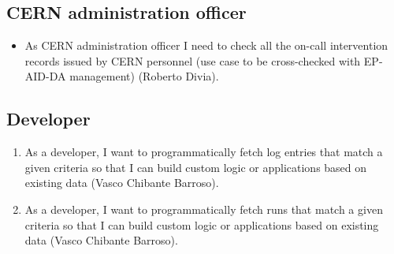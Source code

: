 \subsection{CERN administration officer}
\begin{itemize}
  \item As CERN administration officer I need to check all the on-call intervention records issued by CERN personnel (use case to be cross-checked with EP-AID-DA management) (Roberto Divia).
\end{itemize}

\subsection{Developer}
\begin{enumerate}
  \item As a developer, I want to programmatically fetch log entries that match a given criteria so that I can build custom logic or applications based on existing data (Vasco Chibante Barroso). 
  \item As a developer, I want to programmatically fetch runs that match a given criteria so that I can build custom logic or applications based on existing data (Vasco Chibante Barroso). 
\end{enumerate}

